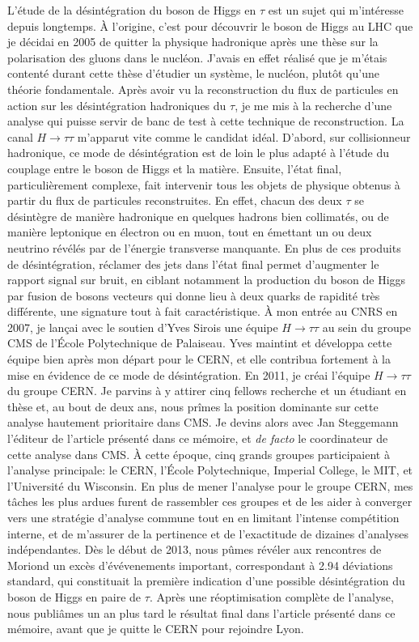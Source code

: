 \documentclass[11pt,twoside,a4paper,tdr]{cms-tdr}
\begin{document}
L'étude de la désintégration du boson de Higgs en $\tau$ est un sujet qui m'intéresse depuis longtemps. 
À l'origine, c'est pour découvrir le boson de Higgs au LHC que je décidai en 2005 de quitter la physique hadronique après une thèse sur la polarisation des gluons dans le nucléon.
J'avais en effet réalisé que je m'étais contenté durant cette thèse d'étudier un système, le nucléon, plutôt qu'une théorie fondamentale. 
Après avoir vu la reconstruction du flux de particules en action sur les désintégration hadroniques du $\tau$, 
je me mis à la recherche d'une analyse qui puisse servir de banc de test à cette technique de reconstruction. 
La canal $H \to \tau \tau$ m'apparut vite comme le candidat idéal. 
D'abord, sur collisionneur hadronique, ce mode de désintégration est de loin le plus adapté à l'étude du couplage entre le boson de Higgs et la matière. 
Ensuite, l'état final, particulièrement complexe, fait intervenir tous les objets de physique obtenus à partir du flux de particules reconstruites.
En effet, chacun des deux $\tau$ se désintègre de manière hadronique en quelques hadrons bien collimatés, 
ou de manière leptonique en électron ou en muon, tout en émettant un ou deux neutrino révélés par de l'énergie transverse manquante. 
En plus de ces produits de désintégration, réclamer des jets dans l'état final permet d'augmenter le rapport signal sur bruit, en ciblant notamment la production du boson de Higgs par fusion de bosons vecteurs qui donne lieu à deux quarks de rapidité très différente, une signature tout à fait caractéristique. 
À mon entrée au CNRS en 2007, je lançai avec le soutien d'Yves Sirois une équipe $H \to \tau \tau$ au sein du groupe CMS de l'École Polytechnique de Palaiseau. 
Yves maintint et développa cette équipe bien après mon départ pour le CERN, et elle contribua fortement à la mise en évidence de ce mode de désintégration. 
En 2011, je créai l'équipe $H \to \tau \tau$ du groupe CERN. 
Je parvins à y attirer cinq fellows recherche et un étudiant en thèse et, au bout de deux ans, nous prîmes la position dominante sur cette analyse hautement prioritaire dans CMS.
Je devins alors avec Jan Steggemann l'éditeur de l'article présenté dans ce mémoire, et {\em de facto} le coordinateur de cette analyse dans CMS. 
À cette époque, cinq grands groupes participaient à l'analyse principale: le CERN, l'École Polytechnique, Imperial College, le MIT, et l'Université du Wisconsin.
En plus de mener l'analyse pour le groupe CERN, mes tâches les plus ardues furent de rassembler ces groupes et de les aider à converger vers une stratégie d'analyse commune tout en en limitant l'intense compétition interne, 
et de m'assurer de la pertinence et de l'exactitude de dizaines d'analyses indépendantes.
Dès le début de 2013, nous pûmes révéler aux rencontres de Moriond 
un excès d'évévenements important, correspondant à 2.94 déviations standard, qui constituait la première indication d'une possible désintégration du boson de Higgs en paire de $\tau$. 
Après une réoptimisation complète de l'analyse, nous publiâmes un an plus tard le résultat final dans l'article présenté dans ce mémoire, avant que je quitte le CERN pour rejoindre Lyon.  
\end{document}
